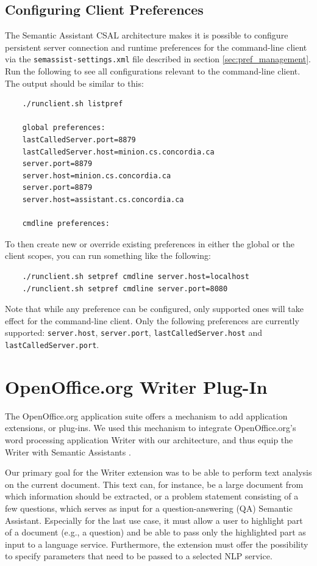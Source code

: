 \subsection*{Configuring Client Preferences}
The Semantic Assistant CSAL architecture makes it is possible to configure persistent server connection and runtime preferences for the command-line client via the \texttt{semassist-settings.xml} file described in section \ref{sec:pref_management}.
Run the following to see all configurations relevant to the command-line client. The output should be similar to this:
\begin{verbatim}
    ./runclient.sh listpref

    global preferences:
    lastCalledServer.port=8879
    lastCalledServer.host=minion.cs.concordia.ca
    server.port=8879
    server.host=minion.cs.concordia.ca
    server.port=8879
    server.host=assistant.cs.concordia.ca

    cmdline preferences:
\end{verbatim}

To then create new or override existing preferences in either the global or the client scopes, you can run something like the following:
\begin{verbatim}
    ./runclient.sh setpref cmdline server.host=localhost
    ./runclient.sh setpref cmdline server.port=8080
\end{verbatim}
Note that while any preference can be configured, only supported ones will take effect for the command-line client.
Only the following preferences are currently supported: \texttt{server.host}, \texttt{server.port}, \texttt{lastCalledServer.host} and \texttt{lastCalledServer.port}.


\section{OpenOffice.org Writer Plug-In}
The OpenOffice.org application suite offers a mechanism
to add application extensions, or plug-ins. We used this
mechanism to integrate OpenOffice.org's word processing
application Writer with our architecture, and thus equip the
Writer with Semantic Assistants \citep{giwi08}.

Our primary goal for the Writer extension was to be able
to perform text analysis on the current document. This
text can, for instance, be a large document from which
information should be extracted, or a problem statement
consisting of a few questions, which serves as input for a
question-answering (QA) Semantic Assistant. Especially
for the last use case, it must allow a user to highlight part of
a document (e.g., a question) and be able to pass only the
highlighted part as input to a language service. Furthermore,
the extension must offer the possibility to specify parameters
that need to be passed to a selected NLP service.

